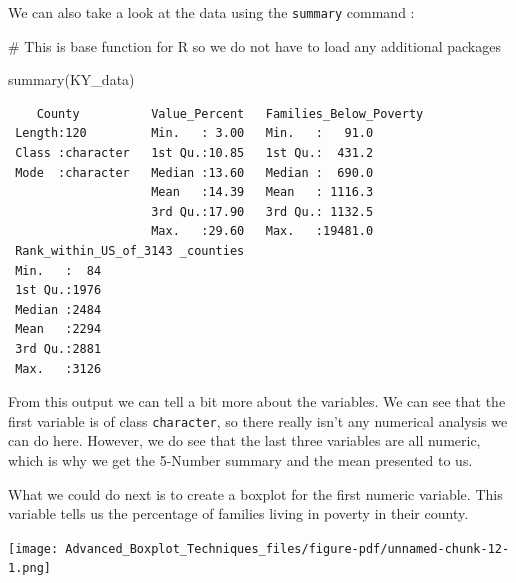 \documentclass[
  letterpaper,
  DIV=11,
  numbers=noendperiod]{scrreprt}
\newenvironment{Shaded}{\begin{snugshade}}{\end{snugshade}}
\newcommand{\AttributeTok}[1]{\textcolor[rgb]{0.40,0.45,0.13}{#1}}
\newcommand{\CommentTok}[1]{\textcolor[rgb]{0.37,0.37,0.37}{#1}}
\newcommand{\FunctionTok}[1]{\textcolor[rgb]{0.28,0.35,0.67}{#1}}
\newcommand{\NormalTok}[1]{\textcolor[rgb]{0.00,0.23,0.31}{#1}}
\newcommand{\SpecialCharTok}[1]{\textcolor[rgb]{0.37,0.37,0.37}{#1}}
\begin{document}
We can also take a look at the data using the \texttt{summary} command :

\begin{Shaded}
\begin{Highlighting}[]
\CommentTok{\# This is base function for R so we do not have to load any additional packages}

\FunctionTok{summary}\NormalTok{(KY\_data)}
\end{Highlighting}
\end{Shaded}

\begin{verbatim}
    County          Value_Percent   Families_Below_Poverty
 Length:120         Min.   : 3.00   Min.   :   91.0       
 Class :character   1st Qu.:10.85   1st Qu.:  431.2       
 Mode  :character   Median :13.60   Median :  690.0       
                    Mean   :14.39   Mean   : 1116.3       
                    3rd Qu.:17.90   3rd Qu.: 1132.5       
                    Max.   :29.60   Max.   :19481.0       
 Rank_within_US_of_3143 _counties
 Min.   :  84                    
 1st Qu.:1976                    
 Median :2484                    
 Mean   :2294                    
 3rd Qu.:2881                    
 Max.   :3126                    
\end{verbatim}

From this output we can tell a bit more about the variables. We can see
that the first variable is of class \texttt{character}, so there really
isn't any numerical analysis we can do here. However, we do see that the
last three variables are all numeric, which is why we get the 5-Number
summary and the mean presented to us.

What we could do next is to create a boxplot for the first numeric
variable. This variable tells us the percentage of families living in
poverty in their county.

\begin{Shaded}
\end{Shaded}

\begin{center}
\texttt{[image: Advanced\_Boxplot\_Techniques\_files/figure-pdf/unnamed-chunk-12-1.png]}
\end{center}
\end{document}
